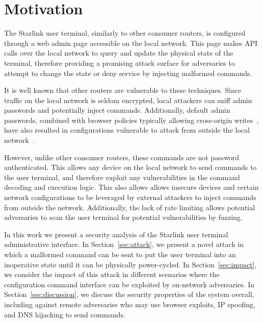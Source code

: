 \section{Motivation}\label{sec:motivation}

The Starlink user terminal, similarly to other consumer routers, is configured through a web admin page accessible on the local network.
This page makes API calls over the local network to query and update the physical state of the terminal, therefore providing a promising attack surface for adversaries to attempt to change the state or deny service by injecting malformed commands.

It is well known that other routers are vulnerable to these techniques.
Since traffic on the local network is seldom encrypted, local attackers can sniff admin passwords and potentially inject commands.
Additionally, default admin passwords, combined with browser policies typically allowing cross-origin writes~\cite{csrf_internal_network,same_origin_policy}, have also resulted in configurations vulnerable to attack from outside the local network~\cite{drive_by_pharming}.

However, unlike other consumer routers, these commands are not password authenticated.
This allows any device on the local network to send commands to the user terminal, and therefore exploit any vulnerabilities in the command decoding and execution logic.
This also allows allows insecure devices and certain network configurations to be leveraged by external attackers to inject commands from outside the network.
Additionally, the lack of rate limiting allows potential adversaries to scan the user terminal for potential vulnerabilities by fuzzing.

In this work we present a security analysis of the Starlink user terminal administrative interface.
In Section~\ref{sec:attack}, we present a novel attack in which a malformed command can be sent to put the user terminal into an inoperative state until it can be physically power-cycled.
In Section~\ref{sec:impact}, we consider the impact of this attack in different scenarios where the configuration command interface can be exploited by on-network adversaries.
In Section~\ref{sec:discussion}, we discuss the security properties of the system overall, including against remote adversaries who may use browser exploits, IP spoofing, and DNS hijacking to send commands.
